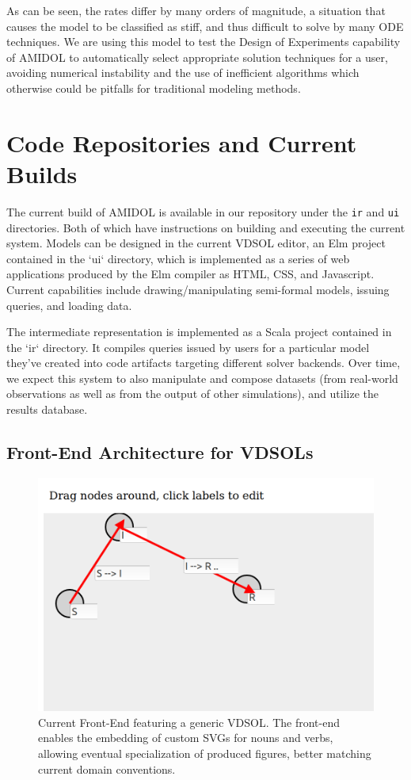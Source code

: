 \documentclass[11pt]{article}
\newcommand{\amidol}{\textsc{AMIDOL}}
\begin{document}
As can be seen, the rates differ by many orders of magnitude, a situation that causes the model to be classified as stiff, and thus difficult to solve by many ODE techniques.  We are using this model to test the Design of Experiments capability of \amidol{} to automatically select appropriate solution techniques for a user, avoiding numerical instability and the use of inefficient algorithms which otherwise could be pitfalls for traditional modeling methods.

\section{Code Repositories and Current Builds}

The current build of \amidol{} is available in our repository under the \texttt{ir} and \texttt{ui} directories.  Both of which have instructions on building and executing the current system.  Models can be designed in the current VDSOL editor, an Elm project contained in the `ui` directory, which is implemented as a series of
web applications produced by the Elm compiler as HTML, CSS, and Javascript. Current capabilities include drawing/manipulating semi-formal models, issuing queries, and loading data.

The intermediate representation is implemented as a Scala project contained in the `ir` directory.  It compiles queries issued by users for a particular model they've created into code artifacts targeting different solver backends. Over time, we expect this
system to also manipulate and compose datasets (from real-world observations
as well as from the output of other simulations), and utilize the results database.


\subsection{Front-End Architecture for VDSOLs}

\begin{figure}
\includegraphics[width=\textwidth]{figs/Editor.png}
\caption{Current Front-End featuring a generic VDSOL.  The front-end enables the embedding of custom SVGs for nouns and verbs, allowing eventual specialization of produced figures, better matching current domain conventions.}
\label{Fig:Editor}
\end{figure}
\end{document}
